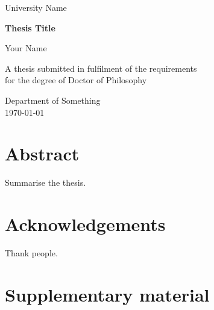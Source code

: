 \documentclass[12pt,a4paper,oneside]{report}
\begin{document}
\begin{titlepage}
  \centering
  {\Large University Name\par}
  \vspace{2cm}
  {\huge\bfseries Thesis Title\par}
  \vspace{1.5cm}
  {\Large Your Name\par}
  \vfill
  A thesis submitted in fulfilment of the requirements\\
  for the degree of Doctor of Philosophy\par
  \vspace{1cm}
  Department of Something\\
  \today
\end{titlepage}

\chapter*{Abstract}
Summarise the thesis.

\chapter*{Acknowledgements}
Thank people.

\tableofcontents
\listoffigures
\listoftables

\clearpage
{}




\appendix
\chapter{Supplementary material}



\end{document}

